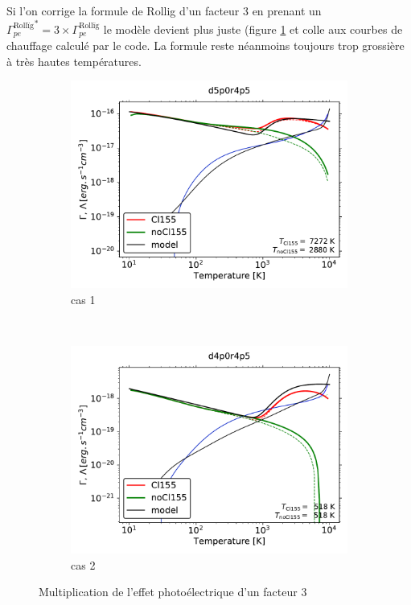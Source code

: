 Si l'on corrige la formule de Rollig d'un facteur 3 en prenant un ${\Gamma^{\mathrm{Rollïg}}_{pe}}^{*} = 3\times \Gamma^{\mathrm{Rollïg}}_{pe}$ le modèle devient plus juste (figure \ref{fig:Cl:particuliers:chofra12} et colle aux courbes de chauffage calculé par le code. La formule reste néanmoins toujours trop grossière à très hautes températures. 

\begin{figure}[!htbp]
    \centering
    \begin{subfigure}[t]{0.45\textwidth} %
        \centering \includegraphics[trim = {0 0 0 0 },clip,width=1\textwidth]{figure/Cl/particuliers/chofra3_d5p0r4p5_d5p0r4p5.pdf}
        \caption{cas 1}
    \end{subfigure}
    ~ 
    \begin{subfigure}[t]{0.45\textwidth}
        \centering \includegraphics[trim = {0 0 0 0 },clip,width=1\textwidth]{figure/Cl/particuliers/chofra3_d4p0r4p5_d4p0r4p5.pdf}
        \caption{cas 2}
    \end{subfigure}
    \caption{Multiplication de l'effet photoélectrique d'un facteur 3}
    \label{fig:Cl:particuliers:chofra12}
\end{figure}

